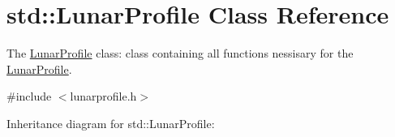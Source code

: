 \hypertarget{classstd_1_1LunarProfile}{}\section{std\+:\+:Lunar\+Profile Class Reference}
\label{classstd_1_1LunarProfile}


The \hyperlink{classstd_1_1LunarProfile}{Lunar\+Profile} class\+: class containing all functions nessisary for the \hyperlink{classstd_1_1LunarProfile}{Lunar\+Profile}.  




{\ttfamily \#include $<$lunarprofile.\+h$>$}



Inheritance diagram for std\+:\+:Lunar\+Profile\+:
